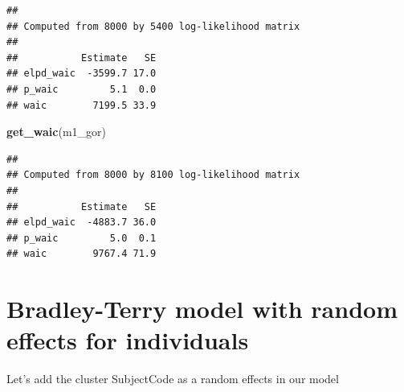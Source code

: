 \documentclass[
]{book}
\newenvironment{Shaded}{\begin{snugshade}}{\end{snugshade}}
\newcommand{\KeywordTok}[1]{\textcolor[rgb]{0.13,0.29,0.53}{\textbf{#1}}}
\newcommand{\NormalTok}[1]{#1}
\begin{document}
\begin{verbatim}
## 
## Computed from 8000 by 5400 log-likelihood matrix
## 
##           Estimate   SE
## elpd_waic  -3599.7 17.0
## p_waic         5.1  0.0
## waic        7199.5 33.9
\end{verbatim}

\begin{Shaded}
\begin{Highlighting}[]
\KeywordTok{get_waic}\NormalTok{(m1_gor)}
\end{Highlighting}
\end{Shaded}

\begin{verbatim}
## 
## Computed from 8000 by 8100 log-likelihood matrix
## 
##           Estimate   SE
## elpd_waic  -4883.7 36.0
## p_waic         5.0  0.1
## waic        9767.4 71.9
\end{verbatim}

\hypertarget{bradley-terry-model-with-random-effects-for-individuals}{%
\section{Bradley-Terry model with random effects for individuals}\label{bradley-terry-model-with-random-effects-for-individuals}}

Let's add the cluster SubjectCode as a random effects in our model
\end{document}
